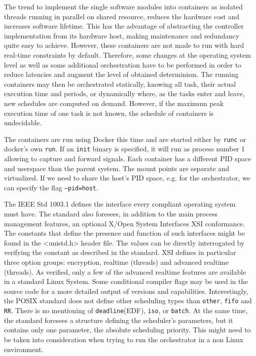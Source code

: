 \documentclass[]{scrartcl}
\begin{document}
The trend to implement the single software modules into containers as isolated threads running in parallel on shared resource, reduces the hardware cost and increases software lifetime. 
This has the advantage of abstracting the controller implementation from its hardware host, making maintenance and redundancy quite easy to achieve. %
However, these containers are not made to run with hard real-time constraints by default. Therefore, some changes at the operating system level as well as some additional orchestration have to be performed in order to reduce latencies and augment the level of obtained determinism.
The running containers may then be orchestrated statically, knowing all task, their actual execution time and periods, or dynamically where, as the tasks enter and leave, new schedules are computed on demand.
However, if the maximum peak execution time of one task is not known, the schedule of containers is undecidable. 

The containers are run using Docker this time and are started either by \texttt{runc} or docker's own \texttt{run}. 
If an \texttt{init} binary is specified, it will run as process number 1 allowing to capture and forward signals.
Each container has a different PID space and userspace than the parent system.
The mount points are separate and virtualized.
If we need to share the host's PID space, e.g. for the orchestrator, we can specify the flag \texttt{--pid=host}.

The IEEE Std 1003.1 defines the interface every compliant operating system must have.
The standard also foresees, in addition to the main process management features, an optional X/Open System Interfaces XSI conformance.
The constants that define the presence and function of such interfaces might be found in the <unistd.h> header file. 
The values can be directly interrogated by verifying the constant as described in the standard.
XSI defines in particular three option groups: encryption, realtime (threads) and advanced realtime (threads). 
As verified, only a few of the advanced realtime features are available in a standard Linux System. 
Some conditional compiler flags may be used in the source code for a more detailed output of versions and capabilities. 
Interestingly, the POSIX standard does not define other scheduling types than \texttt{other}, \texttt{fifo} and \texttt{RR}. 
There is no mentioning of \texttt{deadline}(EDF), \texttt{iso}, or \texttt{batch}. 
At the same time, the standard foresees a structure defining the scheduler's parameters, but it contains only one parameter, the absolute scheduling priority.
This might need to be taken into consideration when trying to run the orchestrator in a non Linux environment.
\end{document}
